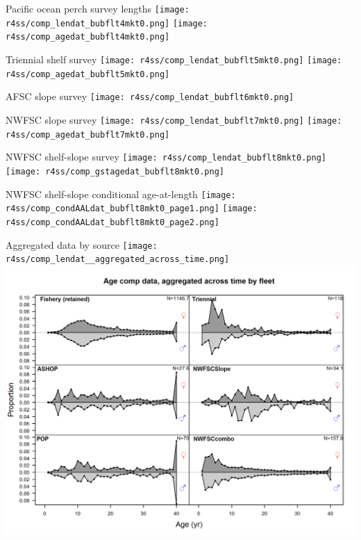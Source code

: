 \documentclass[pdf]{beamer}\usepackage[]{graphicx}\usepackage[]{color}
\begin{document}
\begin{frame}{Pacific ocean perch survey lengths}
  \texttt{[image: r4ss/comp\_lendat\_bubflt4mkt0.png]}
  \texttt{[image: r4ss/comp\_agedat\_bubflt4mkt0.png]}
\end{frame}

\begin{frame}{Triennial shelf survey }
  \texttt{[image: r4ss/comp\_lendat\_bubflt5mkt0.png]}
  \texttt{[image: r4ss/comp\_agedat\_bubflt5mkt0.png]}
\end{frame}

\begin{frame}{AFSC slope survey }
  \texttt{[image: r4ss/comp\_lendat\_bubflt6mkt0.png]}
  
\end{frame}

\begin{frame}{NWFSC slope survey }
    \texttt{[image: r4ss/comp\_lendat\_bubflt7mkt0.png]}
    \texttt{[image: r4ss/comp\_agedat\_bubflt7mkt0.png]}

\end{frame}

\begin{frame}{NWFSC shelf-slope survey }
  \texttt{[image: r4ss/comp\_lendat\_bubflt8mkt0.png]}
  \texttt{[image: r4ss/comp\_gstagedat\_bubflt8mkt0.png]}
\end{frame}


\begin{frame}{NWFSC shelf-slope conditional age-at-length}
    \texttt{[image: r4ss/comp\_condAALdat\_bubflt8mkt0\_page1.png]}
    \texttt{[image: r4ss/comp\_condAALdat\_bubflt8mkt0\_page2.png]}
\end{frame}


\begin{frame}{Aggregated data by source}
    \texttt{[image: r4ss/comp\_lendat\_\_aggregated\_across\_time.png]}
    \includegraphics[scale = 0.37]{figures/comp_agedat__aggregated_across_time.png}
\end{frame}
\end{document}
